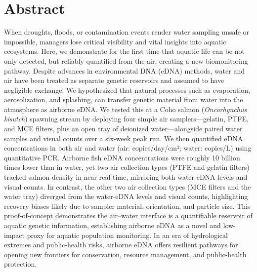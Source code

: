 \documentclass{article}
\begin{document}
\section*{Abstract}
When droughts, floods, or contamination events render water sampling unsafe or impossible, managers lose critical visibility and vital insights into aquatic ecosystems. Here, we demonstrate for the first time that aquatic life can be not only detected, but reliably quantified from the air, creating a new biomonitoring pathway. Despite advances in environmental DNA (eDNA) methods, water and air have been treated as separate genetic reservoirs and assumed to have negligible exchange. We hypothesized that natural processes such as evaporation, aerosolization, and splashing, can transfer genetic material from water into the atmosphere as airborne eDNA. We tested this at a Coho salmon (\textit{Oncorhynchus kisutch}) spawning stream by deploying four simple air samplers—gelatin, PTFE, and MCE filters, plus an open tray of deionized water—alongside paired water samples and visual counts over a six-week peak run. We then quantified eDNA concentrations in both air and water  (air: copies/day/cm²; water: copies/L) using quantitative PCR. Airborne fish eDNA concentrations were roughly 10 billion times lower than in water, yet two air collection types (PTFE and gelatin filters) tracked salmon density in near real time, mirroring both water-eDNA levels and visual counts. In contrast, the other two air collection types (MCE filters and the water tray) diverged from the water-eDNA levels and visual counts, highlighting recovery biases likely due to sampler material, orientation, and particle size. This proof-of-concept demonstrates the air–water interface is a quantifiable reservoir of aquatic genetic information, establishing airborne eDNA as a novel and low-impact proxy for aquatic population monitoring. In an era of hydrological extremes and public-health risks, airborne eDNA offers resilient pathways for opening new frontiers for conservation, resource management, and public-health protection.
\end{document}
